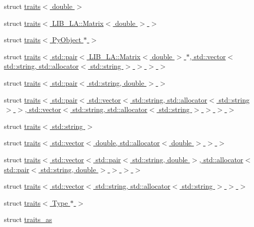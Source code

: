 \begin{DoxyCompactItemize}
\item 
struct \hyperlink{structswig_1_1traits_3_01double_01_4}{traits$<$ double $>$}
\item 
struct \hyperlink{structswig_1_1traits_3_01_l_i_b___l_a_1_1_matrix_3_01double_01_4_01_4}{traits$<$ L\+I\+B\+\_\+\+L\+A\+::\+Matrix$<$ double $>$ $>$}
\item 
struct \hyperlink{structswig_1_1traits_3_01_py_object_01_5_01_4}{traits$<$ Py\+Object $\ast$ $>$}
\item 
struct \hyperlink{structswig_1_1traits_3_01std_1_1pair_3_01_l_i_b___l_a_1_1_matrix_3_01double_01_4_01_5_00_01std_16e7d6ce2d402ca14bbd204dfcec3c665}{traits$<$ std\+::pair$<$ L\+I\+B\+\_\+\+L\+A\+::\+Matrix$<$ double $>$ $\ast$, std\+::vector$<$ std\+::string, std\+::allocator$<$ std\+::string $>$ $>$ $>$ $>$}
\item 
struct \hyperlink{structswig_1_1traits_3_01std_1_1pair_3_01std_1_1string_00_01double_01_4_01_4}{traits$<$ std\+::pair$<$ std\+::string, double $>$ $>$}
\item 
struct \hyperlink{structswig_1_1traits_3_01std_1_1pair_3_01std_1_1vector_3_01std_1_1string_00_01std_1_1allocator_3406a9958f829b04d4a112f01ac608b27}{traits$<$ std\+::pair$<$ std\+::vector$<$ std\+::string, std\+::allocator$<$ std\+::string $>$ $>$, std\+::vector$<$ std\+::string, std\+::allocator$<$ std\+::string $>$ $>$ $>$ $>$}
\item 
struct \hyperlink{structswig_1_1traits_3_01std_1_1string_01_4}{traits$<$ std\+::string $>$}
\item 
struct \hyperlink{structswig_1_1traits_3_01std_1_1vector_3_01double_00_01std_1_1allocator_3_01double_01_4_01_4_01_4}{traits$<$ std\+::vector$<$ double, std\+::allocator$<$ double $>$ $>$ $>$}
\item 
struct \hyperlink{structswig_1_1traits_3_01std_1_1vector_3_01std_1_1pair_3_01std_1_1string_00_01double_01_4_00_01s6c6fb1bc9490e700d02c7f6ac3d156bc}{traits$<$ std\+::vector$<$ std\+::pair$<$ std\+::string, double $>$, std\+::allocator$<$ std\+::pair$<$ std\+::string, double $>$ $>$ $>$ $>$}
\item 
struct \hyperlink{structswig_1_1traits_3_01std_1_1vector_3_01std_1_1string_00_01std_1_1allocator_3_01std_1_1string_01_4_01_4_01_4}{traits$<$ std\+::vector$<$ std\+::string, std\+::allocator$<$ std\+::string $>$ $>$ $>$}
\item 
struct \hyperlink{structswig_1_1traits_3_01_type_01_5_01_4}{traits$<$ Type $\ast$ $>$}
\item 
struct \hyperlink{structswig_1_1traits__as}{traits\+\_\+as}

\end{DoxyCompactItemize}
